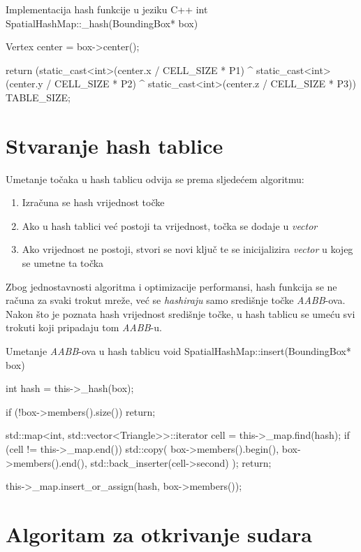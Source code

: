 \begin{cppSource}{Implementacija hash funkcije u jeziku C++}
int SpatialHashMap::_hash(BoundingBox* box) {
    Vertex center = box->center();

    return (static_cast<int>(center.x / CELL_SIZE * P1) ^
            static_cast<int>(center.y / CELL_SIZE * P2) ^
            static_cast<int>(center.z / CELL_SIZE * P3)) %
           TABLE_SIZE;
}
\end{cppSource}

\section{Stvaranje hash tablice}

Umetanje točaka u hash tablicu odvija se prema sljedećem algoritmu:

\begin{enumerate}
    \item Izračuna se hash vrijednost točke
    \item Ako u hash tablici već postoji ta vrijednost, točka se dodaje u \textit{vector}
    \item Ako vrijednost ne postoji, stvori se novi ključ te se inicijalizira \textit{vector}
          u kojeg se umetne ta točka
\end{enumerate}

Zbog jednostavnosti algoritma i optimizacije performansi, hash funkcija se ne
računa za svaki trokut mreže, već se \textit{hashiraju} samo središnje točke
\textit{AABB}-ova. Nakon što je poznata hash vrijednost središnje točke, u
hash tablicu se umeću svi trokuti koji pripadaju tom \textit{AABB}-u.


\begin{cppSource}{Umetanje \textit{AABB}-ova u hash tablicu}
void SpatialHashMap::insert(BoundingBox* box) {
    int hash = this->_hash(box);

    if (!box->members().size()) return;

    std::map<int, std::vector<Triangle>>::iterator cell = this->_map.find(hash);
    if (cell != this->_map.end()) {
        std::copy(
            box->members().begin(),
            box->members().end(),
            std::back_inserter(cell->second)
        );
        return;
    }

    this->_map.insert_or_assign(hash, box->members());
}
\end{cppSource}

\section{Algoritam za otkrivanje sudara}

